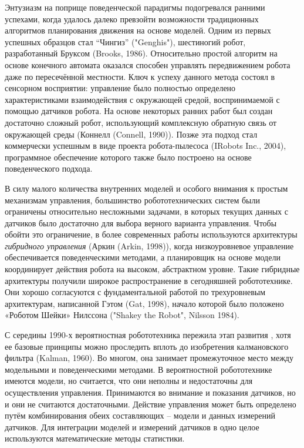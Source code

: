 \documentclass[10pt,a4paper]{article}
\begin{document}
Энтузиазм на поприще поведенческой парадигмы подогревался ранними успехами, когда удалось далеко превзойти возможности традиционных алгоритмов планирования движения на основе моделей. Одним из первых успешных образцов стал “Чингиз” ("Genghis"), шестиногий робот, разработанный Бруксом (Brooks, 1986). Относительно простой алгоритм на основе конечного автомата оказался способен управлять передвижением робота даже по пересечённой местности. Ключ к успеху данного метода состоял в сенсорном восприятии: управление было полностью определено характеристиками взаимодействия с окружающей средой, воспринимаемой с помощью датчиков робота. На основе некоторых ранних работ был создан достаточно сложный робот, использующий комплексную обратную связь от окружающей среды (Коннелл (Connell, 1990)). Позже эта подход стал коммерчески успешным в виде проекта робота-пылесоса (IRobots Inc., 2004), программное обеспечение которого также было построено на основе поведенческого подхода.

В силу малого количества внутренних моделей и особого внимания к простым механизмам управления, большинство робототехнических систем были ограничены относительно несложными задачами, в которых текущих данных с датчиков было достаточно для выбора верного варианта управления. Чтобы обойти это ограничение, в более современных работы используются архитектуры \textit{гибридного управления} (Аркин (Arkin, 1998)), когда низкоуровневое управление обеспечивается поведенческими методами, а планировщик на основе модели координирует действия робота на высоком, абстрактном уровне. Такие гибридные архитектуры получили широкое распространение в сегодняшней робототехнике. Они хорошо согласуются с фундаментальной работой по трехуровневым архитектурам, написанной Гэтом (Gat, 1998), начало которой было положено «Роботом Шейки» Нилссона ("Shakey the Robot", Nilsson 1984).

С середины 1990-х вероятностная робототехника пережила этап развития , хотя ее базовые принципы можно проследить вплоть до изобретения калмановского фильтра (Kalman, 1960). Во многом, она занимает промежуточное место между модельными и поведенческими методами. В вероятностной робототехнике имеются модели, но считается, что они неполны и недостаточны для осуществления управления. Принимаются во внимание и показания датчиков, но и они не считаются достаточными. Действие управления может быть определено путём комбинирования обеих составляющих – модели и данных измерений датчиков.  Для интеграции моделей и измерений датчиков в одно целое используются математические методы статистики.
\end{document}
